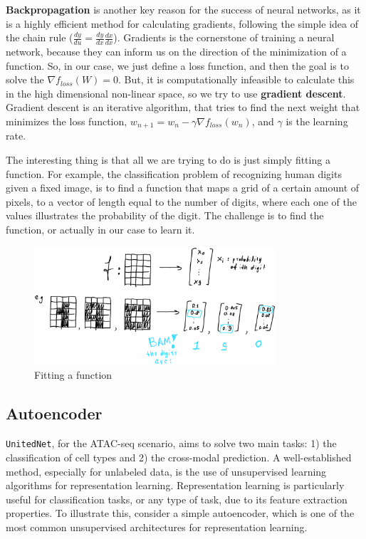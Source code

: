 \documentclass[12pt, a4paper]{article}
\begin{document}
\textbf{Backpropagation} is another key reason for the success of neural networks, as it is a highly efficient method for calculating gradients, following the simple idea of the chain rule ($\frac{dy}{du} = \frac{dy}{dx} \frac{dx}{dx}$). Gradients is the cornerstone of training a neural network, because they can inform us on the direction of the minimization of a function. So, in our case, we just define a loss function, and then the goal is to solve the $\nabla f_{loss}(W) = 0$. But, it is computationally infeasible to calculate this in the high dimensional non-linear space, so we try to use \textbf{gradient descent}. Gradient descent is an iterative algorithm, that tries to find the next weight that minimizes the loss function, $w_{n+1} = w_{n} - \gamma \nabla f_{loss}(w_n)$, and $\gamma$ is the learning rate.


The interesting thing is that all we are trying to do is just simply fitting a function. For example, the classification problem of recognizing human digits given a fixed image, is to find a function that maps a grid of a certain amount of pixels, to a vector of length equal to the number of digits, where each one of the values illustrates the probability of the digit. The challenge is to find the function, or actually in our case to learn it.

\begin{figure}[h!]
  \centering
  \includegraphics[width=0.8\textwidth]{fit_function.png}
  \caption{Fitting a function}
\end{figure}

\clearpage


\subsection{Autoencoder}

\verb|UnitedNet|, for the ATAC-seq scenario, aims to solve two main tasks: 1) the classification of cell types and 2) the cross-modal prediction. A well-established method, especially for unlabeled data, is the use of unsupervised learning algorithms for representation learning. Representation learning is particularly useful for classification tasks, or any type of task, due to its feature extraction properties. To illustrate this, consider a simple autoencoder, which is one of the most common unsupervised architectures for representation learning.
\end{document}
